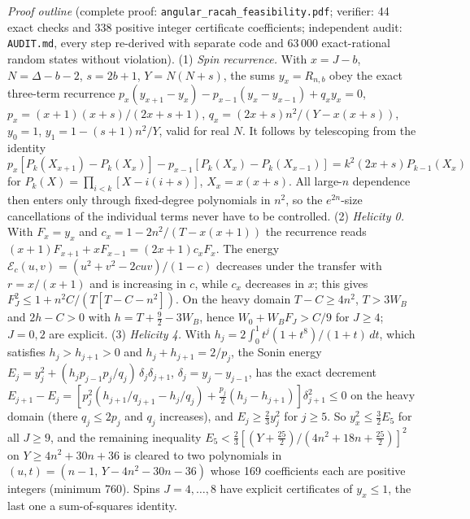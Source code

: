 \emph{Proof outline} (complete proof: \texttt{angular\_racah\_feasibility.pdf}; verifier: 44 exact checks and 338 positive integer
certificate coefficients; independent audit: \texttt{AUDIT.md}, every step re-derived with separate code and 63\,000 exact-rational
random states without violation).
(1) \emph{Spin recurrence.} With $x=J-b$, $N=\Delta-b-2$, $s=2b+1$, $Y=N(N+s)$, the sums $y_x=R_{n,b}$ obey the exact three-term recurrence
$p_x(y_{x+1}-y_x)-p_{x-1}(y_x-y_{x-1})+q_xy_x=0$, $p_x=(x+1)(x+s)/(2x+s+1)$, $q_x=(2x+s)n^2/(Y-x(x+s))$, $y_0=1$, $y_1=1-(s+1)n^2/Y$, valid
for real $N$. It follows by telescoping from the identity
$p_x[P_k(X_{x+1})-P_k(X_x)]-p_{x-1}[P_k(X_x)-P_k(X_{x-1})]=k^2(2x+s)P_{k-1}(X_x)$ for $P_k(X)=\prod_{i<k}[X-i(i+s)]$, $X_x=x(x+s)$.
All large-$n$ dependence then enters only through fixed-degree polynomials in $n^2$, so the $e^{2n}$-size cancellations of the
individual terms never have to be controlled.
(2) \emph{Helicity 0.} With $F_x=y_x$ and $c_x=1-2n^2/(T-x(x+1))$ the recurrence reads $(x+1)F_{x+1}+xF_{x-1}=(2x+1)c_xF_x$. The energy
$\mathcal E_c(u,v)=(u^2+v^2-2cuv)/(1-c)$ decreases under the transfer with $r=x/(x+1)$ and is increasing in $c$, while $c_x$ decreases in $x$;
this gives $F_J^2\le1+n^2C/(T[T-C-n^2])$. On the heavy domain $T-C\ge4n^2$, $T>3W_B$ and $2h-C>0$ with $h=T+\tfrac92-3W_B$, hence
$W_0+W_BF_J>C/9$ for $J\ge4$; $J=0,2$ are explicit.
(3) \emph{Helicity 4.} With $h_j=2\int_0^1t^j(1+t^8)/(1+t)\,dt$, which satisfies $h_j>h_{j+1}>0$ and $h_j+h_{j+1}=2/p_j$, the Sonin energy
$E_j=y_j^2+(h_jp_{j-1}p_j/q_j)\,\delta_j\delta_{j+1}$, $\delta_j=y_j-y_{j-1}$, has the exact decrement
$E_{j+1}-E_j=[p_j^2(h_{j+1}/q_{j+1}-h_j/q_j)+\tfrac{p_j}2(h_j-h_{j+1})]\delta_{j+1}^2\le0$ on the heavy domain (there $q_j\le2p_j$ and $q_j$
increases), and $E_j\ge\tfrac23y_j^2$ for $j\ge5$. So $y_x^2\le\tfrac32E_5$ for all $J\ge9$, and the remaining inequality
$E_5<\tfrac23[(Y+\tfrac{25}2)/(4n^2+18n+\tfrac{25}2)]^2$ on $Y\ge4n^2+30n+36$ is cleared to two polynomials in $(u,t)=(n-1,\,Y-4n^2-30n-36)$ whose 169
coefficients each are positive integers (minimum 760). Spins $J=4,\dots,8$ have explicit certificates of $y_x\le1$, the last one a
sum-of-squares identity.


